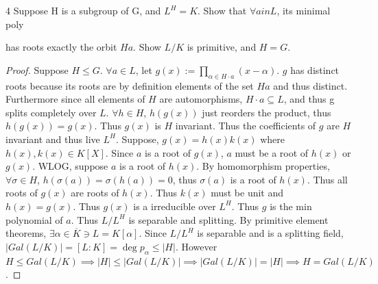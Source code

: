 \documentclass{article}
\begin{document}
\bigskip

\begin{PROB}{4}\label{Problem 4.}
    Suppose H is a subgroup of G, and $L^H = K$. Show that $\forall a in L$, its minimal poly

has roots exactly the orbit $Ha$. Show $L/K$ is primitive, and $H = G$. 
\end{PROB}
\begin{proof}
    Suppose $H \leq G$.  
    $\forall a \in L$, let $g(x) := \prod_{\alpha \in H \cdot a}(x - \alpha)$. $g$ has distinct roots because its roots are by definition elements of the set $Ha$ and thus distinct. Furthermore since all elements of $H$ are automorphisms, $H \cdot a \subseteq L$, and thus g splits completely over $L$. $\forall h \in H$, $h(g(x))$ just reorders the product, thus $h(g(x)) = g(x)$. Thus $g(x)$ is $H$ invariant. Thus the coefficients of $g$ are $H$ invariant and thus live $L^H$. Suppose, $g(x) = h(x)k(x)$ where $h(x), k(x) \in K[X]$. Since $a$ is a root of $g(x)$, $a$ must be a root of $h(x)$ or $g(x)$. WLOG, suppose $a$ is a root of $h(x)$. By homomorphism properties, $\forall \sigma \in H$, $h(\sigma(a)) = \sigma(h(a)) = 0$, thus $\sigma(a)$ is a root of $h(x)$. Thus all roots of $g(x)$ are roots of $h(x)$. Thus $k(x)$ must be unit and $h(x) = g(x)$. Thus $g(x)$ is a irreducible over $L^H$. Thus $g$ is the min polynomial of $a$. Thus $L / L^H$ is separable and splitting. By primitive element theorems, $\exists \alpha \in \overline{K} \ni L = K[\alpha]$. Since $L / L^H$ is separable and is a splitting field, $|Gal(L / K)| = [L : K] = \deg p_\alpha \leq |H|$. However $H \leq Gal(L / K) \implies |H| \leq |Gal(L / K)| \implies |Gal(L / K)| = |H| \implies H = Gal(L / K)$. 
\end{proof}

\bigskip
\end{document}
